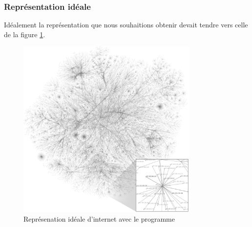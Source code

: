 \subsubsection{Représentation idéale}
Idéalement la représentation que nous souhaitions obtenir devait tendre vers celle de la figure \ref{ideal}. 
\begin{figure}[H]
\begin{center}
        \includegraphics[width=0.8\textwidth]{./schema/Internet_map_1024_transparent.png}
\caption{Représenation idéale d'internet avec le programme}
\label{ideal}
\end{center}
\end{figure}

